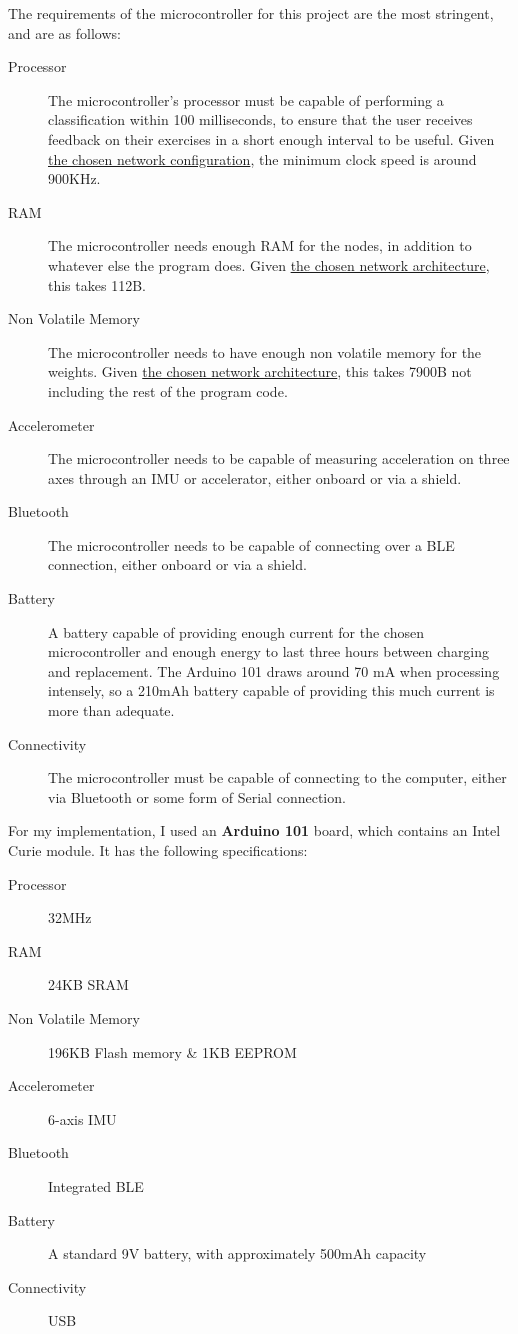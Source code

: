 \documentclass[a4paper]{article}
\begin{document}
The requirements of the microcontroller for this project are the most stringent, and are as follows:

\begin{description}
\item[Processor] The microcontroller's processor must be capable of performing a classification within 100 milliseconds, to ensure that the user receives feedback on their exercises in a short enough interval to be useful. Given \hyperref[subsec:dc_networkarchitecture]{the chosen network configuration}, the minimum clock speed is around 900KHz.\cite{dsref0}
\item[RAM] The microcontroller needs enough RAM for the nodes, in addition to whatever else the program does. Given \hyperref[subsec:dc_networkarchitecture]{the chosen network architecture}, this takes 112B.
\item[Non Volatile Memory] The microcontroller needs to have enough non volatile memory for the weights. Given \hyperref[subsec:dc_networkarchitecture]{the chosen network architecture}, this takes 7900B not including the rest of the program code\cite{dsref2}.
\item[Accelerometer] The microcontroller needs to be capable of measuring acceleration on three axes through an IMU or accelerator, either onboard or via a shield.
\item[Bluetooth] The microcontroller needs to be capable of connecting over a BLE connection, either onboard or via a shield.
\item[Battery] A battery capable of providing enough current for the chosen microcontroller and enough energy to last three hours between charging and replacement. The Arduino 101 draws around 70 mA when processing intensely,\cite{dsref3} so a 210mAh battery capable of providing this much current is more than adequate.
\item[Connectivity] The microcontroller must be capable of connecting to the computer, either via Bluetooth or some form of Serial connection.
\end{description}

For my implementation, I used an \textbf{Arduino 101} board, which contains an Intel Curie module. It has the following specifications:\cite{dsref4}

\begin{description}
\item[Processor] 32MHz
\item[RAM] 24KB SRAM
\item[Non Volatile Memory] 196KB Flash memory \& 1KB EEPROM
\item[Accelerometer] 6-axis IMU
\item[Bluetooth] Integrated BLE 
\item[Battery] A standard 9V battery, with approximately 500mAh capacity\cite{dsref5}
\item[Connectivity] USB
\end{description}
\end{document}
